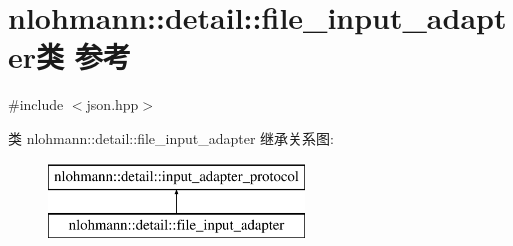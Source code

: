 \hypertarget{classnlohmann_1_1detail_1_1file__input__adapter}{}\section{nlohmann\+::detail\+::file\+\_\+input\+\_\+adapter类 参考}
\label{classnlohmann_1_1detail_1_1file__input__adapter}


{\ttfamily \#include $<$json.\+hpp$>$}

类 nlohmann\+::detail\+::file\+\_\+input\+\_\+adapter 继承关系图\+:\begin{figure}[H]
\begin{center}
\leavevmode
\includegraphics[height=2.000000cm]{classnlohmann_1_1detail_1_1file__input__adapter}
\end{center}
\end{figure}
